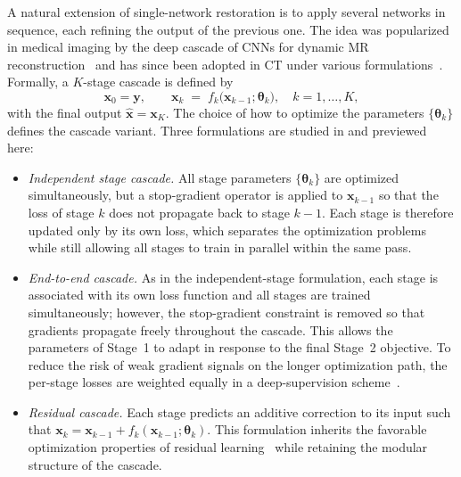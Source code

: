A natural extension of single-network restoration is to apply several networks in sequence, each refining the output of the previous one. The idea was popularized in medical imaging by the deep cascade of CNNs for dynamic MR reconstruction~\cite{Schlemper2018} and has since been adopted in CT under various formulations~\cite{Wang2020, Zhang2022}. Formally, a $K$-stage cascade is defined by
\begin{equation}
    \boldsymbol{x}_{0} = \boldsymbol{y}, \qquad
    \boldsymbol{x}_{k} \;=\; f_{k}\!\bigl(\boldsymbol{x}_{k-1};\boldsymbol{\theta}_{k}\bigr),
    \quad k = 1,\ldots,K,
    \label{eq:cascade_generic}
\end{equation}
with the final output $\hat{\boldsymbol{x}} = \boldsymbol{x}_{K}$. The choice of how to optimize the parameters $\{\boldsymbol{\theta}_{k}\}$ defines the cascade variant.
Three formulations are studied in  and previewed here:
\begin{itemize}
    \item \emph{Independent stage cascade.} All stage parameters $\{\boldsymbol{\theta}_{k}\}$ are optimized simultaneously, but a stop-gradient operator is applied to $\boldsymbol{x}_{k-1}$ so that the loss of stage $k$ does not propagate back to stage $k{-}1$. Each stage is therefore updated only by its own loss, which separates the optimization problems while still allowing all stages to train in parallel within the same pass.
    
    \item \emph{End-to-end cascade.} As in the independent-stage formulation, each stage is associated with its own loss function and all stages are trained simultaneously; however, the stop-gradient constraint is removed so that gradients propagate freely throughout the cascade. This allows the parameters of Stage~1 to adapt in response to the final Stage~2 objective. To reduce the risk of weak gradient signals on the longer optimization path, the per-stage losses are weighted equally in a deep-supervision scheme~\cite{He2016, LeCun2015}.
    
    \item \emph{Residual cascade.} Each stage predicts an additive correction to its input such that $\boldsymbol{x}_{k} = \boldsymbol{x}_{k-1} + f_{k}(\boldsymbol{x}_{k-1}; \boldsymbol{\theta}_{k})$. This formulation inherits the favorable optimization properties of residual learning~\cite{He2016, Zhang2017} while retaining the modular structure of the cascade.
\end{itemize}
